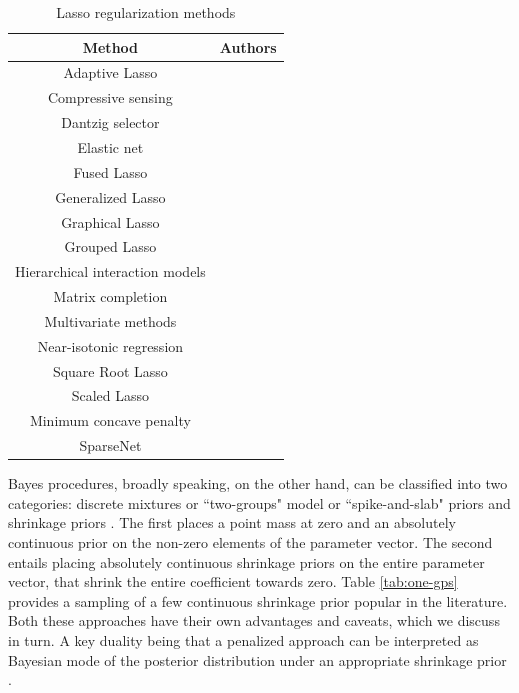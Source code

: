\documentclass[sts,preprint]{imsart}
\begin{document}
\begin{table}[ht!]
  \centering
  \caption{Lasso regularization methods}
  \footnotesize{
    \begin{tabular}{|c|c|}
    \hline
    Method  & Authors  \bigstrut\\
    \hline
    Adaptive Lasso & \citet{zou2006adaptive} \bigstrut[t]\\
    Compressive sensing  & \citet{donoho2006compressed,candes2008restricted} \\
    Dantzig selector  & \citet{candes2007dantzig} \\
    Elastic net & \citet{zou2005regularization} \\
    Fused Lasso & \citet{tibshirani_sparsity_2005} \\
    Generalized Lasso & \citet{tibshirani2011solution} \\
    Graphical Lasso & \citet{friedman2008sparse} \\
    Grouped Lasso & \citet{yuan2006model} \\
    Hierarchical interaction models & \citet{bien_lasso_2013} \\
    Matrix completion & \citet{candes2010power,mazumder2010spectral} \\
    Multivariate methods & \citet{jolliffe2003modified,witten2009penalized} \\
    Near-isotonic regression & \citet{tibshirani2011nearly} \\
    Square Root Lasso  & \citet{belloni2011square} \\
    Scaled Lasso & \citet{sun2012scaled} \\
    Minimum concave penalty & \citet{zhang2010nearly} \\
    SparseNet & \citet{mazumder2012} \bigstrut[b]\\
    \hline
    \end{tabular}%
    }
  \label{tab:lasso:ext}%
\end{table}%

Bayes procedures, broadly speaking, on the other hand, can be classified into two categories: discrete mixtures or ``two-groups" model or ``spike-and-slab" priors \citep{johnstone2004needles,efron2010large,efron2008microarrays,bogdan2011asymptotic} and shrinkage priors \citep{armagan2011generalized,armagan2013generalized,carvalho2009handling,carvalho2010horseshoe,griffin2005alternative,polson2010shrink,castillo2012needles}. The first places a point mass at zero and an absolutely continuous prior on the non-zero elements of the parameter vector. The second entails placing absolutely continuous shrinkage priors on the entire parameter vector, that shrink the entire coefficient towards zero. Table \ref{tab:one-gps} provides a sampling of a few continuous shrinkage prior popular in the literature. Both these approaches have their own advantages and caveats, which we discuss in turn.  A key duality being that a penalized approach can be interpreted as Bayesian mode of the posterior distribution under an appropriate shrinkage prior \citep{polson2015mixtures}. 
\end{document}
